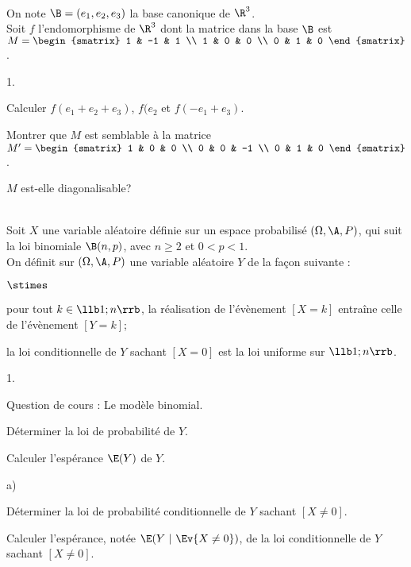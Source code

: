 \documentclass[11pt]{article}%
\begin{document}
\begin{exerciceSP}~\\
  On note $\B = (e_1 , e_2 , e_3)$ la base canonique de $\R^3$. \\
  Soit $f$ l'endomorphisme de $\R^3$ dont la matrice dans la base
  $\B$ est $M = 
  \begin{smatrix} 
    1 & -1 & 1 \\
    1 & 0 & 0 \\
    0 & 1 & 0 
  \end{smatrix}$. 
  \begin{noliste}{1.}
    \setlength{\itemsep}{2mm}
  \item Calculer $f(e_1 + e_2 + e_3)$, $f(e_2$ et $f(-e_1 + e_3)$.
  \item Montrer que $M$ est semblable à la matrice $M'
    = \begin{smatrix} 
      1 & 0 & 0 \\ 
      0 & 0 & -1 \\ 
      0 & 1 & 0
    \end{smatrix}$.
  \item $M$ est-elle diagonalisable?
  \end{noliste}
\end{exerciceSP}


\newpage


\begin{exerciceAP}~\\
  Soit $X$ une variable aléatoire définie sur un espace probabilisé
  $(\Omega , \A , P)$, qui suit la loi binomiale $\B (n ,
  p)$, avec $n \geq 2$ et $0 < p < 1$.
  \\[.2cm]
  On définit sur $(\Omega , \A , P)$ une variable aléatoire $Y$ de la
  façon suivante :
  \begin{noliste}{$\stimes$}
  \item pour tout $k \in \llb 1 ; n \rrb$, la réalisation de
    l'évènement $[X=k]$ entraîne celle de l'évènement $[Y=k]$;
  \item la loi conditionnelle de $Y$ sachant $[X=0]$ est la loi
    uniforme sur $\llb 1 ; n \rrb$.
  \end{noliste}
  \begin{noliste}{1.}
    \setlength{\itemsep}{2mm}
  \item Question de cours : Le modèle binomial. 
  \item Déterminer la loi de probabilité de $Y$.
  \item Calculer l'espérance $\E(Y)$ de $Y$.
  \item 
    \begin{noliste}{a)}
    \setlength{\itemsep}{2mm} \item Déterminer la loi de probabilité
      conditionnelle de $Y$ sachant $[X \neq 0]$.
    \item Calculer l'espérance, notée $\E(Y \ | \ \Ev{X \neq 0})$, de
      la loi conditionnelle de $Y$ sachant $[X \neq 0]$.
    \end{noliste}
  \end{noliste}
\end{exerciceAP}
\end{document}
